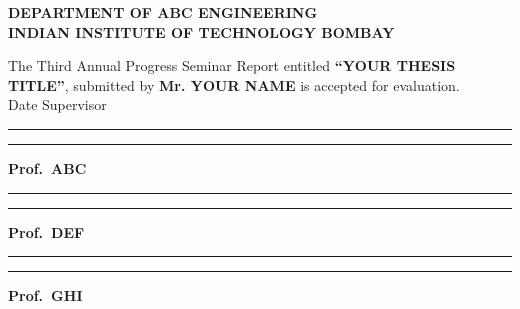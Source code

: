 \vspace{15mm}
\begin{center}
{\fontsize{16pt}{0}
}
\end{center}

\vspace{5mm}
\begin{center}
{\bf DEPARTMENT OF ABC ENGINEERING\\
INDIAN INSTITUTE OF TECHNOLOGY BOMBAY}
\end{center}
The Third Annual Progress Seminar Report entitled {\bf ``YOUR THESIS TITLE''}, submitted by 
{\bf Mr. YOUR NAME} is accepted for evaluation. \\

\vspace{5mm}
\noindent \hspace{0.40 in} Date \hspace{4.10 in} Supervisor
\vspace{5mm} \\
\noindent \rule{0.2\textwidth}{1pt} \hspace{3.1 in} \rule{0.3\textwidth}{1pt}

\hspace{4.025 in} {\bf  Prof.\ ABC}
\vspace{5mm} \\
\noindent \rule{0.2\textwidth}{1pt} \hspace{3.1 in} \rule{0.3\textwidth}{1pt}

\hspace{4.025 in} {\bf  Prof.\ DEF}
\vspace{5mm} \\

\noindent \rule{0.2\textwidth}{1pt} \hspace{3.1 in} \rule{0.3\textwidth}{1pt}

\hspace{4.025 in} {\bf  Prof.\ GHI}
% 
% 

